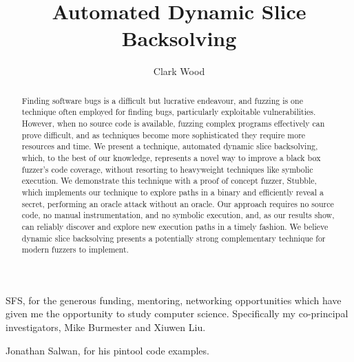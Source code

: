 \documentclass[11pt,expanded,copyright]{fsuthesis}
\title{Automated Dynamic Slice Backsolving}
\author{Clark Wood}
\begin{document}
\frontmatter
\maketitle
\makecommitteepage


\begin{acknowledgments}

SFS, for the generous funding, mentoring, networking opportunities which have given me the opportunity to study computer science. Specifically my co-principal investigators, Mike Burmester and Xiuwen Liu.


Jonathan Salwan, for his pintool code examples.

\end{acknowledgments}

\tableofcontents
\listoffigures




\mainmatter

%

\begin{abstract}

Finding software bugs is a difficult but lucrative endeavour, and fuzzing is one technique often employed for finding bugs, particularly exploitable vulnerabilities. However, when no source code is available, fuzzing complex programs effectively can prove difficult, and as techniques become more sophisticated they require more resources and time. We present a technique, automated dynamic slice backsolving, which, to the best of our knowledge, represents a novel way to improve a black box fuzzer's code coverage, without resorting to heavyweight techniques like symbolic execution. We demonstrate this technique with a proof of concept fuzzer, Stubble, which implements our technique to explore paths in a binary and efficiently reveal a secret, performing an oracle attack without an oracle. Our approach requires no source code, no manual instrumentation, and no symbolic execution, and, as our results show, can reliably discover and explore new execution paths in a timely fashion. We believe dynamic slice backsolving presents a potentially strong complementary technique for modern fuzzers to implement.

\end{abstract}
\end{document}
